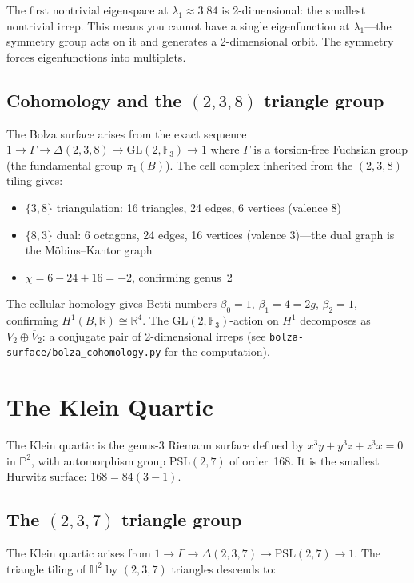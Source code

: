\documentclass[11pt,a4paper]{article}
\begin{document}
The first nontrivial eigenspace at $\lambda_1 \approx 3.84$ is 2-dimensional:
the smallest nontrivial irrep. This means you cannot have a single
eigenfunction at $\lambda_1$---the symmetry group acts on it and generates
a 2-dimensional orbit. The symmetry forces eigenfunctions into multiplets.

\subsection{Cohomology and the $(2,3,8)$ triangle group}

The Bolza surface arises from the exact sequence
$1 \to \Gamma \to \Delta(2,3,8) \to \mathrm{GL}(2,\mathbb{F}_3) \to 1$
where $\Gamma$ is a torsion-free Fuchsian group (the fundamental group
$\pi_1(B)$). The cell complex inherited from the $(2,3,8)$ tiling gives:

\begin{itemize}[leftmargin=*]
  \item $\{3,8\}$ triangulation: 16 triangles, 24 edges, 6 vertices (valence 8)
  \item $\{8,3\}$ dual: 6 octagons, 24 edges, 16 vertices (valence 3)---the
    dual graph is the M\"{o}bius--Kantor graph
  \item $\chi = 6 - 24 + 16 = -2$, confirming genus~2
\end{itemize}

The cellular homology gives Betti numbers $\beta_0 = 1$, $\beta_1 = 4 = 2g$,
$\beta_2 = 1$, confirming $H^1(B, \mathbb{R}) \cong \mathbb{R}^4$.
The $\mathrm{GL}(2,\mathbb{F}_3)$-action on $H^1$ decomposes as
$V_2 \oplus \overline{V}_2$: a conjugate pair of 2-dimensional irreps
(see \texttt{bolza-surface/bolza\_cohomology.py} for the computation).

\section{The Klein Quartic}

The Klein quartic is the genus-3 Riemann surface defined by
$x^3 y + y^3 z + z^3 x = 0$ in $\mathbb{P}^2$, with automorphism group
$\mathrm{PSL}(2,7)$ of order~168. It is the smallest Hurwitz surface:
$168 = 84(3-1)$.

\subsection{The $(2,3,7)$ triangle group}

The Klein quartic arises from
$1 \to \Gamma \to \Delta(2,3,7) \to \mathrm{PSL}(2,7) \to 1$.
The triangle tiling of $\mathbb{H}^2$ by $(2,3,7)$ triangles descends to:
\end{document}
